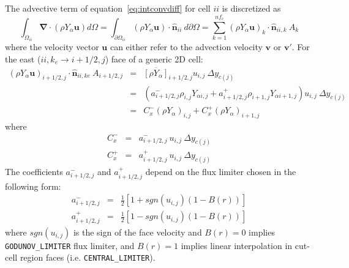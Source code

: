 \documentclass[12pt]{article}
\begin{document}
The advective term of equation~\eqref{eq:intconvdiff} for cell $ii$ is discretized as
%
\begin{equation}
  \int_{\Omega_{ii}} { \boldsymbol{\nabla} \cdot  \left(  \rho Y_\alpha \mathbf{u} \right) } d \Omega =
  \int_{\partial \Omega_{ii}} { \left( \rho Y_\alpha \mathbf{u} \right) \cdot \hat{\mathbf{n}}_{ii} } \: d \partial \Omega =
  \sum^{nf_c}_{k=1} \left( \rho Y_\alpha \mathbf{u} \right)_k \cdot \hat{\mathbf{n}}_{ii,k} \: A_k \label{eq:fvadv}
\end{equation}
%
where the velocity vector $\mathbf{u}$ can either refer to the advection velocity $\mathbf{v}$ or $\mathbf{v}'$. For the east ($ii,k_e \rightarrow i+1/2,j$)  face of a generic 2D cell:
%
\begin{eqnarray}
  \left( \rho Y_\alpha \mathbf{u} \right)_{i+1/2,j} \cdot \hat{\mathbf{n}}_{ii,ke} \: A_{i+1/2,j} & = & 
  \overline{\left[ \rho Y_\alpha \right]}_{i+1/2,j} u_{i,j} \: \Delta y_{c(j)} \nonumber \\
  & = & \left(a^-_{i+1/2,j} \rho_{i,j} Y_{\alpha i,j} + a^+_{i+1/2,j} \rho_{i+1,j} Y_{\alpha i+1,j} \right) u_{i,j} \: \Delta y_{c(j)} \nonumber \\ 
  & = & C^-_x  \left( \rho Y_{\alpha} \right)_{i,j}  +  C^+_x  \left( \rho Y_{\alpha} \right)_{i+1,j} \label{eq:advfvcx}
\end{eqnarray}
%
where
%
\begin{eqnarray}
   C^-_x & = &  a^-_{i+1/2,j} \: u_{i,j}  \: \Delta y_{c(j)} \\
   C^+_x & = &  a^+_{i+1/2,j} \: u_{i,j} \:  \Delta y_{c(j)} 
\end{eqnarray}
%
The coefficients $a^-_{i+1/2,j}$ and $a^+_{i+1/2,j}$ depend on the flux limiter chosen in the following form: 
%
\begin{eqnarray}
   a^-_{i+1/2,j}  & = & \frac{1}{2} \left[ 1 + sgn(u_{i,j}) \left(1-B(r) \right) \right] \\
   a^+_{i+1/2,j} & = & \frac{1}{2} \left[ 1 - sgn(u_{i,j}) \left(1-B(r) \right) \right]
\end{eqnarray}
%
where $sgn(u_{i,j})$ is the sign of the face velocity and $B(r)=0$ implies \texttt{GODUNOV\_LIMITER} flux limiter, and $B(r)=1$ implies linear interpolation in cut-cell region faces (i.e. \texttt{CENTRAL\_LIMITER}). 
\end{document}

